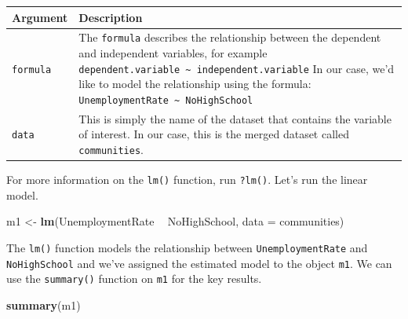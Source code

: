 \documentclass[]{article}
\newenvironment{Shaded}{\begin{snugshade}}{\end{snugshade}}
\newcommand{\DataTypeTok}[1]{\textcolor[rgb]{0.13,0.29,0.53}{#1}}
\newcommand{\KeywordTok}[1]{\textcolor[rgb]{0.13,0.29,0.53}{\textbf{#1}}}
\newcommand{\NormalTok}[1]{#1}
\newcommand{\OperatorTok}[1]{\textcolor[rgb]{0.81,0.36,0.00}{\textbf{#1}}}
\newcommand{\StringTok}[1]{\textcolor[rgb]{0.31,0.60,0.02}{#1}}
\begin{document}
\begin{longtable}[]{@{}ll@{}}
\toprule
\begin{minipage}[b]{0.11\columnwidth}\raggedright
Argument\strut
\end{minipage} & \begin{minipage}[b]{0.83\columnwidth}\raggedright
Description\strut
\end{minipage}\tabularnewline
\midrule
\endhead
\begin{minipage}[t]{0.11\columnwidth}\raggedright
\texttt{formula}\strut
\end{minipage} & \begin{minipage}[t]{0.83\columnwidth}\raggedright
The \texttt{formula} describes the relationship between the dependent and independent variables, for example \texttt{dependent.variable\ \textasciitilde{}\ independent.variable} In our case, we'd like to model the relationship using the formula: \texttt{UnemploymentRate\ \textasciitilde{}\ NoHighSchool}\strut
\end{minipage}\tabularnewline
\begin{minipage}[t]{0.11\columnwidth}\raggedright
\texttt{data}\strut
\end{minipage} & \begin{minipage}[t]{0.83\columnwidth}\raggedright
This is simply the name of the dataset that contains the variable of interest. In our case, this is the merged dataset called \texttt{communities}.\strut
\end{minipage}\tabularnewline
\bottomrule
\end{longtable}

For more information on the \texttt{lm()} function, run \texttt{?lm()}. Let's run the linear model.

\begin{Shaded}
\begin{Highlighting}[]
\NormalTok{m1 <-}\StringTok{ }\KeywordTok{lm}\NormalTok{(UnemploymentRate }\OperatorTok{~}\StringTok{ }\NormalTok{NoHighSchool, }\DataTypeTok{data =}\NormalTok{ communities)}
\end{Highlighting}
\end{Shaded}

The \texttt{lm()} function models the relationship between \texttt{UnemploymentRate} and \texttt{NoHighSchool} and we've assigned the estimated model to the object \texttt{m1}. We can use the \texttt{summary()} function on \texttt{m1} for the key results.

\begin{Shaded}
\begin{Highlighting}[]
\KeywordTok{summary}\NormalTok{(m1)}
\end{Highlighting}
\end{Shaded}
\end{document}
